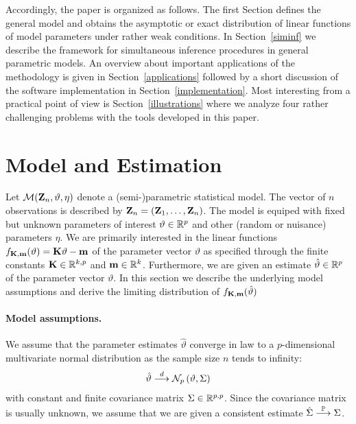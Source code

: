 \documentclass[12pt]{article}
\begin{document}
Accordingly, the paper is organized as follows. 
The first Section defines the general model and obtains 
the asymptotic or exact distribution of linear functions
of model parameters under rather weak conditions. 
In Section~\ref{siminf} we
describe the framework for simultaneous inference
procedures in general parametric models. An overview about important applications
of the methodology is given in Section~\ref{applications} followed
by a short discussion of the software implementation in Section~\ref{implementation}.
Most interesting from a practical point of view is
Section~\ref{illustrations} where we analyze four rather challenging
problems with the tools developed in this paper.


\section{Model and Estimation} \label{model}

Let $\mathcal{M}(\mathbf{Z}_n, \vartheta, \eta)$ denote a (semi-)parametric statistical model.
The vector of $n$ observations is described by $\mathbf{Z}_n = (\mathbf{Z}_1, \dots, \mathbf{Z}_n)$. 
The model is equiped with fixed
but unknown parameters of interest $\vartheta \in \mathbb{R}^p$ 
and other (random or nuisance) parameters $\eta$. 
We are primarily interested in the linear
functions $f_{\mathbf{K}, \mathbf{m}}(\vartheta) = \mathbf{K} \vartheta - \mathbf{m}$
of the parameter vector $\vartheta$ as specified through the finite
constants $\mathbf{K} \in \mathbb{R}^{k, p}$
and $\mathbf{m} \in \mathbb{R}^k$. Furthermore, we are given
an estimate $\hat{\vartheta} \in \mathbb{R}^p$ of the parameter
vector $\vartheta$. In this section we describe the underlying model
assumptions and derive the limiting distribution of $f_{\mathbf{K},\mathbf{m}}(\hat{\vartheta})$


\paragraph{Model assumptions.}

We assume that the parameter estimates $\hat{\vartheta}$ converge in law
to a $p$-dimensional multivariate normal distribution as the sample
size $n$ tends to infinity:
\begin{eqnarray} \label{normality}
\hat{\vartheta} \stackrel{d}{\longrightarrow} \mathcal{N}_p\left(\vartheta, \Sigma\right)
\end{eqnarray}
with constant and finite covariance matrix $\Sigma \in \mathbb{R}^{p,p}$.
Since the covariance matrix is usually unknown, we assume 
that we are given a consistent estimate $\hat{\Sigma} \stackrel{\mathbb{P}}{\longrightarrow} \Sigma$.
\end{document}
